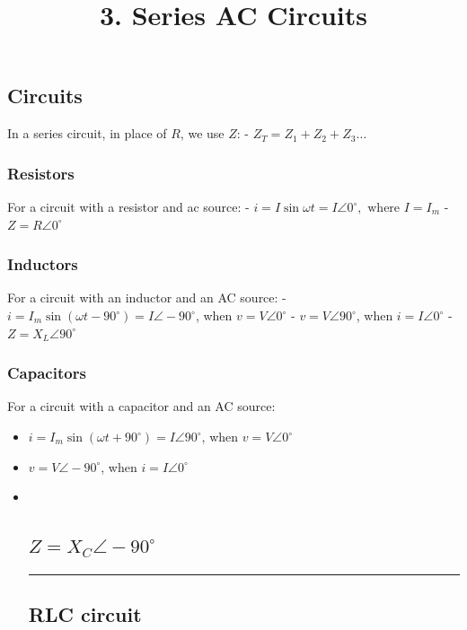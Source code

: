 \documentclass[
  a4paper,
]{article}
\title{3. Series AC Circuits}
\author{}
\date{}
\renewcommand*\contentsname{Table of contents}
\newcommand\contentsname{Table of contents}
\begin{document}
\maketitle

\renewcommand*\contentsname{Table of contents}
{
\setcounter{tocdepth}{3}
\tableofcontents
}

\subsection{Circuits}\label{circuits}

In a series circuit, in place of \(R\), we use \(Z\): -
\(Z_T = Z_1 + Z_2 + Z_3 \dots\)

\subsubsection{Resistors}\label{resistors}

For a circuit with a resistor and ac source: -
\(i = I \sin \omega t = I \angle 0^\circ, \text{ where } I = I_m\) -
\(Z = R \angle 0^\circ\)

\subsubsection{Inductors}\label{inductors}

For a circuit with an inductor and an AC source: -
\(i = I_m \sin (\omega t -90^\circ) = I\angle -90^\circ\), when
\(v = V \angle 0^\circ\) - \(v = V\angle 90^\circ\), when
\(i = I \angle 0^\circ\) - \(Z = X_L \angle 90^\circ\)

\subsubsection{Capacitors}\label{capacitors}

For a circuit with a capacitor and an AC source:

\begin{itemize}
\item
  \(i = I_m \sin (\omega t + 90^\circ) = I\angle 90^\circ\), when
  \(v = V \angle 0^\circ\)
\item
  \(v = V\angle -90^\circ\), when \(i = I \angle 0^\circ\)
\item ~
  \subsection{\texorpdfstring{\(Z = X_C \angle -90^\circ\)}{Z = X\_C \textbackslash angle -90\^{}\textbackslash circ}}\label{z-x_c-angle--90circ}

  \begin{center}\rule{0.5\linewidth}{0.5pt}\end{center}

  \subsection{RLC circuit}\label{rlc-circuit}
\end{itemize}
\end{document}
